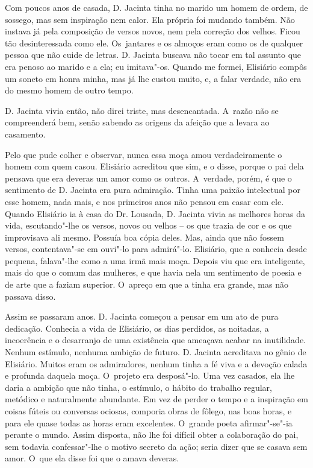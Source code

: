 Com poucos anos de casada, D. Jacinta tinha no marido um homem de ordem,
de sossego, mas sem inspiração nem calor. Ela própria foi mudando
também. Não instava já pela composição de versos novos, nem pela
correção dos velhos. Ficou tão desinteressada como ele. Os~jantares e os
almoços eram como os de qualquer pessoa que não cuide de letras. D.
Jacinta buscava não tocar em tal assunto que era penoso ao marido e a
ela; eu imitava"-os. Quando me formei, Elisiário compôs um soneto em
honra minha, mas já lhe custou muito, e, a falar verdade, não era do
mesmo homem de outro tempo.

D. Jacinta vivia então, não direi triste, mas desencantada. A~razão não
se compreenderá bem, senão sabendo as origens da afeição que a levara ao
casamento.

Pelo que pude colher e observar, nunca essa moça amou verdadeiramente o
homem com quem casou. Elisiário acreditou que sim, e o disse, porque o
pai dela pensava que era deveras um amor como os outros. A~verdade,
porém, é que o sentimento de D. Jacinta era pura admiração. Tinha uma
paixão intelectual por esse homem, nada mais, e nos primeiros anos não
pensou em casar com ele. Quando Elisiário ia à casa do Dr. Lousada, D.
Jacinta vivia as melhores horas da vida, escutando"-lhe os versos, novos
ou velhos -- os que trazia de cor e os que improvisava ali mesmo.
Possuía boa cópia deles. Mas, ainda que não fossem versos, contentava"-se
em ouvi"-lo para admirá"-lo. Elisiário, que a conhecia desde pequena,
falava"-lhe como a uma irmã mais moça. Depois viu que era inteligente,
mais do que o comum das mulheres, e que havia nela um sentimento de
poesia e de arte que a faziam superior. O~apreço em que a tinha era
grande, mas não passava disso.

Assim se passaram anos. D. Jacinta começou a pensar em um ato de pura
dedicação. Conhecia a vida de Elisiário, os dias perdidos, as noitadas,
a incoerência e o desarranjo de uma existência que ameaçava acabar na
inutilidade. Nenhum estímulo, nenhuma ambição de futuro. D. Jacinta
acreditava no gênio de Elisiário. Muitos eram os admiradores, nenhum
tinha a fé viva e a devoção calada e profunda daquela moça. O~projeto
era desposá"-lo. Uma vez casados, ela lhe daria a ambição que não tinha,
o estímulo, o hábito do trabalho regular, metódico e naturalmente
abundante. Em vez de perder o tempo e a inspiração em coisas fúteis ou
conversas ociosas, comporia obras de fôlego, nas boas horas, e para ele
quase todas as horas eram excelentes. O~grande poeta afirmar"-se"-ia
perante o mundo. Assim disposta, não lhe foi difícil obter a colaboração
do pai, sem todavia confessar"-lhe o motivo secreto da ação; seria dizer
que se casava sem amor. O~que ela disse foi que o amava deveras.

